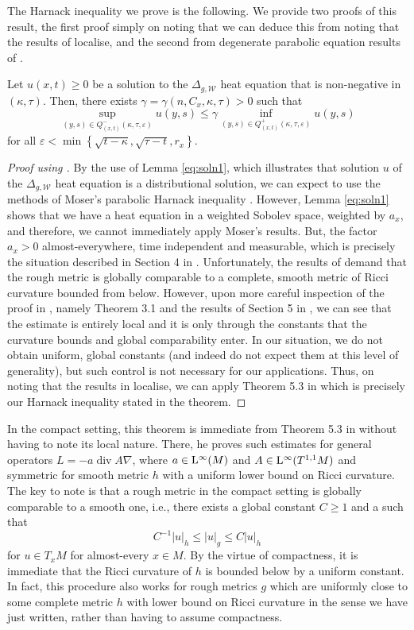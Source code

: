 \documentclass[AMS,STIX1COL]{WileyNJD-v2}
\numberwithin{equation}{section}
\renewcommand{\~}{\tilde}
\renewcommand{\-}{\bar}
\newcommand{\8}{\infty}
\newcommand{\cW}{\mathcal{W}}
\newcommand{\dbrac}[1]{\left\{#1\right\}}
\newcommand{\modulus}[1]{|#1|}
\newcommand{\set}[1]{\dbrac{#1}}
\renewcommand{\epsilon}{\varepsilon}
\DeclareMathOperator{\divv}{div}		%
\newcommand{\Lp}[2][{}]{{\rm L}^{#2}_{\rm #1}}		%
\begin{document}
The Harnack inequality we prove is the following. We provide two proofs of this result, 
the first proof simply on noting that we can deduce this from noting that the results
of \cite{SC} localise, and the second from degenerate parabolic equation results of \cite{CS}.

\begin{thm}
\label{thm:Harnack}
Let $u(x,t) \geq 0$ be a
solution to the $\Delta_{g,\cW}$ heat equation 
that is non-negative in $(\kappa, \tau)$. 
Then, there exists $\gamma = \gamma(n, C_x, \kappa, \tau) > 0$ such that 
$$ \sup_{(y,s) \in Q^-_{(x,t)}(\kappa, \tau,\epsilon)} u(y, s) 
	\leq \gamma \inf_{(y,s) \in Q^+_{(x,t)}(\kappa,\tau,\epsilon)} u(y,s)$$
for all $\epsilon < \min\set{ \sqrt{t - \kappa}, \sqrt{\tau - t}, r_x}$.
\end{thm}

\begin{proof}[Proof using \cite{SC}]
By the use of Lemma \ref{eq:soln1}, which illustrates that solution $u$ of the $\Delta_{g,\cW}$ heat equation is a distributional solution, we can expect to use the methods of Moser's parabolic Harnack inequality \cite{MR0159139,MR0288405}. 
However, Lemma \ref{eq:soln1} shows that we have a heat equation in a weighted Sobolev space, weighted by $a_x$, and therefore, we cannot immediately apply Moser's results. 
But, the factor $a_x > 0$ almost-everywhere, time independent and measurable, which is precisely the situation described in Section 4 in  \cite{SC}.   Unfortunately, the results of \cite{SC} demand that the rough metric is globally comparable to a complete, smooth metric of Ricci curvature bounded from below.
However, upon more careful inspection of the proof in \cite{SC}, namely Theorem 3.1 and the results of Section 5 in \cite{SC},  we can see that the estimate is entirely local and it is only through the constants that the curvature bounds and global comparability enter.
In our situation, we do not obtain uniform, global constants (and indeed do not expect them at this level of generality), but such control is not necessary for our applications. Thus, on noting that the results in \cite{SC} localise, we can apply Theorem 5.3 in \cite{SC} which is precisely our Harnack inequality stated in the theorem.
\end{proof}

In the compact setting, this theorem 
is immediate from Theorem 5.3 in \cite{SC} without having to note
its local nature. There, 
he proves such estimates for general operators
$L = -a \divv A \nabla$, where $a \in \Lp{\infty}(M)$
and $A \in \Lp{\infty}(T^{1,1}M)$ and symmetric
for smooth metric $h$ with a uniform lower bound
on Ricci curvature.
The key to note is that a rough metric in the 
compact setting is globally comparable to a smooth one, 
i.e., there exists a global constant $C \geq 1$ 
and a 
such that
$$ C^{-1} \modulus{u}_{h} \leq \modulus{u}_g \leq C \modulus{u}_{h}$$
for $u \in T_x M$ for almost-every $x \in M$.
By the virtue of compactness, it is immediate
that the Ricci curvature of $h$ is bounded below
by a uniform constant. 
In fact, this procedure also works 
for rough metrics $g$ which 
are uniformly close to some complete metric $h$ with 
lower bound on Ricci curvature in the sense
we have just written, rather than having to assume compactness.
\end{document}
